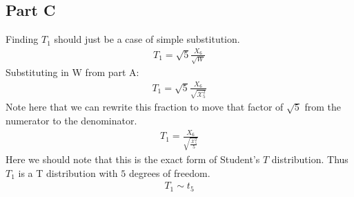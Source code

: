 \documentclass{article}
\begin{document}
\subsection*{Part C}
Finding $T_1$ should just be a case of simple substitution.
\begin{align*}
T_1 = \sqrt{5} \frac{X_6}{\sqrt{W}}
\end{align*}
Substituting in W from part A:
\begin{align*}
T_1 = \sqrt{5} \frac{X_6}{\sqrt{\mathcal{X}_5^2}}
\end{align*}
Note here that we can rewrite this fraction to move that factor of $\sqrt{5}$ from the numerator to the denominator.
\begin{align*}
T_1 = \frac{X_6}{\sqrt{\tfrac{\mathcal{X}_5^2}{5}}} 
\end{align*}
Here we should note that this is the exact form of Student's $T$ distribution. Thus $T_1$ is a T distribution with $5$ degrees of freedom.
\begin{align*}
T_1 \sim t_{5}
\end{align*}
\end{document}
